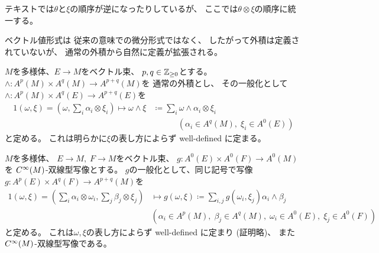 \documentclass[report]{jlreq}
\begin{document}
\begin{remark}
    テキストでは$\theta$と$\xi$の順序が逆になったりしているが、
    ここでは$\theta \otimes \xi$の順序に統一する。
\end{remark}

ベクトル値形式は
従来の意味での微分形式ではなく、
したがって外積は定義されていないが、
通常の外積から自然に定義が拡張される。

\begin{definition}[ベクトル値形式の外積]
    $M$を多様体、$E \to M$をベクトル束、
    $p, q \in \mathbb{Z}_{\ge 0}$とする。
    $\wedge \colon A^p(M) \times A^q(M) \to A^{p + q}(M)$を
    通常の外積とし、
    その一般化として
    $\wedge \colon A^p(M) \times A^q(E) \to A^{p + q}(E)$を
    \begin{alignat}{1}
        (\omega, \xi)
            = \left(
                \omega,
                \sum_{i} \alpha_i \otimes \xi_i
            \right)
            \mapsto
            \omega \wedge \xi
            &\coloneqq
            \sum_{i} \omega \wedge \alpha_i \otimes \xi_i \\
        &\qquad \quad
            (\alpha_i \in A^q(M), \; \xi_i \in A^0(E))
    \end{alignat}
    と定める。
    これは明らかに$\xi$の表し方によらず well-defined に定まる。
\end{definition}

\begin{definition}[ベクトル値形式の内積]
    $M$を多様体、
    $E \to M, \; F \to M$をベクトル束、
    $g \colon A^0(E) \times A^0(F) \to A^0(M)$を
    $C^\infty(M)$-双線型写像とする。
    $g$の一般化として、同じ記号で写像
    $g \colon A^p(E) \times A^q(F) \to A^{p + q}(M)$を
    \begin{alignat}{1}
        (\omega, \xi)
            = \left(
                \sum_{i} \alpha_i \otimes \omega_i,
                \sum_{j} \beta_j \otimes \xi_j
            \right)
            &\mapsto
            g(\omega, \xi)
            \coloneqq
            \sum_{i, j}
            g(\omega_i, \xi_j)
            \alpha_i \wedge \beta_j \\
        &
            (
                \alpha_i \in A^p(M), \; \beta_j \in A^q(M), \;
                \omega_i \in A^0(E), \; \xi_j \in A^0(F)
            )
    \end{alignat}
    と定める。
    これは$\omega, \xi$の表し方によらず well-defined に定まり (証明略)、
    また$C^\infty(M)$-双線型写像である。
\end{definition}
\end{document}
